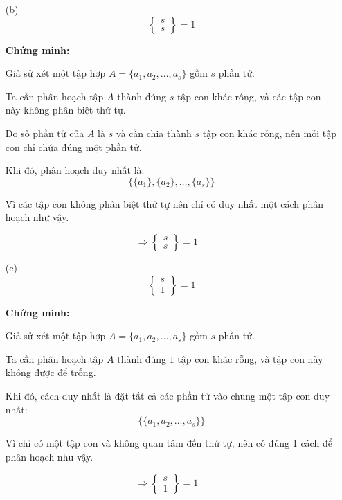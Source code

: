 \documentclass{article}
\begin{document}
	\begin{enumerate}
		\item[(b)] 
		\[
		\left\{ \begin{matrix}
			s \\
			s
		\end{matrix} \right\} = 1
		\]
		
		\textbf{Chứng minh:}
		
		Giả sử xét một tập hợp $A = \{a_1, a_2, \ldots, a_s\}$ gồm $s$ phần tử.
		
		Ta cần phân hoạch tập $A$ thành đúng $s$ tập con khác rỗng, và các tập con này không phân biệt thứ tự.
		
		Do số phần tử của $A$ là $s$ và cần chia thành $s$ tập con khác rỗng, nên mỗi tập con chỉ chứa đúng một phần tử.
		
		Khi đó, phân hoạch duy nhất là:
		\[
		\big\{ \{a_1\}, \{a_2\}, \ldots, \{a_s\} \big\}
		\]
		
		Vì các tập con không phân biệt thứ tự nên chỉ có duy nhất một cách phân hoạch như vậy.
		
		\[
		\Rightarrow \left\{ \begin{matrix}
			s \\
			s
		\end{matrix} \right\} = 1 \quad 
		\]
	\end{enumerate}
	
	\begin{enumerate}
		\item[(c)] 
		\[
		\left\{ \begin{matrix}
			s \\
			1
		\end{matrix} \right\} = 1
		\]
		
		\textbf{Chứng minh:}
		
		Giả sử xét một tập hợp $A = \{a_1, a_2, \ldots, a_s\}$ gồm $s$ phần tử.
		
		Ta cần phân hoạch tập $A$ thành đúng $1$ tập con khác rỗng, và tập con này không được để trống.
		
		Khi đó, cách duy nhất là đặt tất cả các phần tử vào chung một tập con duy nhất:
		\[
		\big\{ \{a_1, a_2, \ldots, a_s\} \big\}
		\]
		
		Vì chỉ có một tập con và không quan tâm đến thứ tự, nên có đúng 1 cách để phân hoạch như vậy.
		
		\[
		\Rightarrow \left\{ \begin{matrix}
			s \\
			1
		\end{matrix} \right\} = 1 \quad 
		\]
	\end{enumerate}
	
\end{document}
